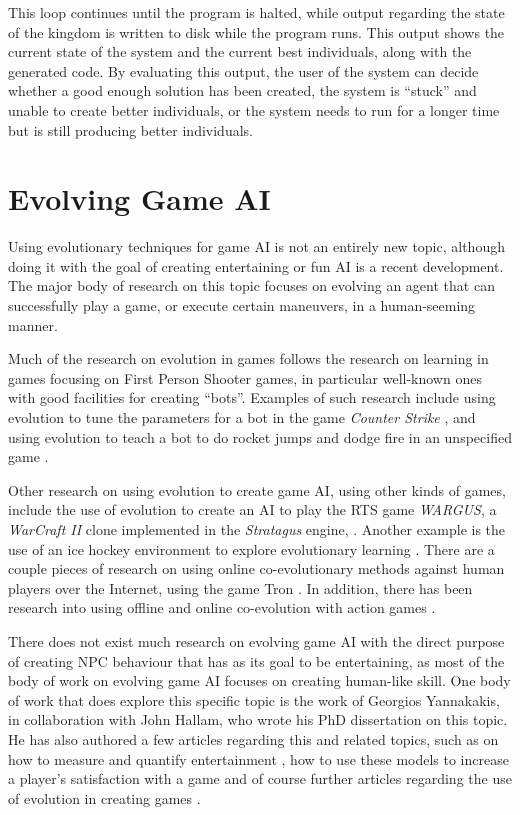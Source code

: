 This loop continues until the program is halted, while output regarding the
state of the kingdom is written to disk while the program runs. This output
shows the current state of the system and the current best individuals, along
with the generated code. By evaluating this output, the user of the system can
decide whether a good enough solution has been created, the system is ``stuck''
and unable to create better individuals, or the system needs to run for a longer
time but is still producing better individuals.

\section{Evolving Game AI}
\label{cha:game-ai-via}

Using evolutionary techniques for game AI is not an entirely new topic, although
doing it with the goal of creating entertaining or fun AI is a recent
development. The major body of research on this topic focuses on evolving an
agent that can successfully play a game, or execute certain maneuvers, in a
human-seeming manner.

Much of the research on evolution in games follows the research on learning in
games focusing on First Person Shooter games, in particular well-known ones with
good facilities for creating ``bots''. Examples of such research include using
evolution to tune the parameters for a bot in the game \emph{Counter Strike}
\citep{cole2004using}, and using evolution to teach a bot to do rocket jumps and
dodge fire in an unspecified game \citep{champandard2003ai}.

Other research on using evolution to create game AI, using other kinds of games,
include the use of evolution to create an AI to play the RTS game \emph{WARGUS},
a \emph{WarCraft II} clone implemented in the \emph{Stratagus} engine,
\citep{spronck2004difficulty}. Another example is the use of an ice hockey
environment to explore evolutionary learning \citep{blair1999exploring}. There
are a couple pieces of research on using online co-evolutionary methods against
human players over the Internet, using the game Tron
\citep{funes2000measuring,funes1998animal}. In addition, there has been research
into using offline and online co-evolution with action games
\citep{demasi2003online}.

There does not exist much research on evolving game AI with the direct purpose
of creating NPC behaviour that has as its goal to be entertaining, as most of
the body of work on evolving game AI focuses on creating human-like skill. One
body of work that does explore this specific topic is the work of Georgios
Yannakakis, in collaboration with John Hallam, who wrote his PhD dissertation
\citep{yannakakis2005ai} on this topic. He has also authored a few articles
regarding this and related topics, such as on how to measure and quantify
entertainment
\citep{yannakakis2007modeling,yannakakis2008model,yannakakis2008entertainment},
how to use these models to increase a player's satisfaction with a game
\citep{yannakakis2009real,yannakakis2008model} and of course further articles
regarding the use of evolution in creating games
\citep{yannakakis2004evolving,yannakakis2004interactive}.

